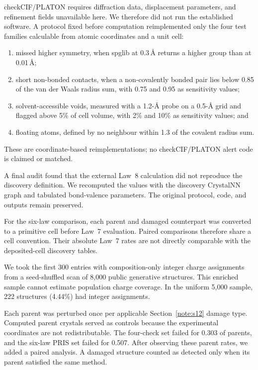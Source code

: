 checkCIF/PLATON requires diffraction data, displacement parameters, and
refinement fields unavailable here. We therefore did not run the established
software. A protocol fixed before computation reimplemented only the four test
families calculable from atomic coordinates and a unit cell:
\begin{enumerate}
\item missed higher symmetry, when spglib at 0.3\,\AA{} returns a higher group
than at 0.01\,\AA{};
\item short non-bonded contacts, when a non-covalently bonded pair lies below
0.85 of the van der Waals radius sum, with 0.75 and 0.95 as sensitivity values;
\item solvent-accessible voids, measured with a 1.2-\AA{} probe on a 0.5-\AA{}
grid and flagged above 5\% of cell volume, with 2\% and 10\% as sensitivity
values; and
\item floating atoms, defined by no neighbour within 1.3 of the covalent radius
sum.
\end{enumerate}
These are coordinate-based reimplementations; no checkCIF/PLATON alert code is
claimed or matched.

A final audit found that the external Law~8 calculation did not reproduce the
discovery definition. We recomputed the values with the discovery CrystalNN graph
and tabulated bond-valence parameters. The original protocol, code, and outputs
remain preserved.

For the six-law comparison, each parent and damaged counterpart was converted to
a primitive cell before Law~7 evaluation. Paired comparisons therefore share a
cell convention. Their absolute Law~7 rates are not directly comparable with the
deposited-cell discovery tables.

We took the first 300 entries with composition-only integer charge assignments
from a seed-shuffled scan of 8{,}000 public generative structures. This enriched
sample cannot estimate population charge coverage. In the uniform 5{,}000
sample, 222 structures (4.44\%) had integer assignments.

Each parent was perturbed once per applicable Section~\ref{note:s12} damage type.
Computed parent crystals served as controls because the experimental coordinates
are not redistributable. The four-check set failed for 0.303 of parents, and the
six-law PRIS set failed for 0.507. After observing these parent rates, we added a
paired analysis. A damaged structure counted as detected only when its parent
satisfied the same method.

